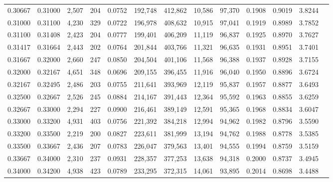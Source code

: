 \begin{tabular}{rrrrrrrrrrrrr}
0.30667 & 0.31000 & 2,507 & 204 &                                     0.0752 & 192,748 & 412,862 &  10,586 &  97,370 & 0.1908 & 0.9019 & 3.8244 \\
0.31000 & 0.31100 & 4,230 & 329 &                                     0.0722 & 196,978 & 408,632 &  10,915 &  97,041 & 0.1919 & 0.8989 & 3.7852 \\
0.31100 & 0.31408 & 2,423 & 204 &                                     0.0777 & 199,401 & 406,209 &  11,119 &  96,837 & 0.1925 & 0.8970 & 3.7627 \\
0.31417 & 0.31664 & 2,443 & 202 &                                     0.0764 & 201,844 & 403,766 &  11,321 &  96,635 & 0.1931 & 0.8951 & 3.7401 \\
0.31667 & 0.32000 & 2,660 & 247 &                                     0.0850 & 204,504 & 401,106 &  11,568 &  96,388 & 0.1937 & 0.8928 & 3.7155 \\
0.32000 & 0.32167 & 4,651 & 348 &                                     0.0696 & 209,155 & 396,455 &  11,916 &  96,040 & 0.1950 & 0.8896 & 3.6724 \\
0.32167 & 0.32495 & 2,486 & 203 &                                     0.0755 & 211,641 & 393,969 &  12,119 &  95,837 & 0.1957 & 0.8877 & 3.6493 \\
0.32500 & 0.32667 & 2,526 & 245 &                                     0.0884 & 214,167 & 391,443 &  12,364 &  95,592 & 0.1963 & 0.8855 & 3.6259 \\
0.32667 & 0.33000 & 2,294 & 227 &                                     0.0900 & 216,461 & 389,149 &  12,591 &  95,365 & 0.1968 & 0.8834 & 3.6047 \\
0.33000 & 0.33200 & 4,931 & 403 &                                     0.0756 & 221,392 & 384,218 &  12,994 &  94,962 & 0.1982 & 0.8796 & 3.5590 \\
0.33200 & 0.33500 & 2,219 & 200 &                                     0.0827 & 223,611 & 381,999 &  13,194 &  94,762 & 0.1988 & 0.8778 & 3.5385 \\
0.33500 & 0.33667 & 2,436 & 207 &                                     0.0783 & 226,047 & 379,563 &  13,401 &  94,555 & 0.1994 & 0.8759 & 3.5159 \\
0.33667 & 0.34000 & 2,310 & 237 &                                     0.0931 & 228,357 & 377,253 &  13,638 &  94,318 & 0.2000 & 0.8737 & 3.4945 \\
0.34000 & 0.34200 & 4,938 & 423 &                                     0.0789 & 233,295 & 372,315 &  14,061 &  93,895 & 0.2014 & 0.8698 & 3.4488 \\

\end{tabular}
